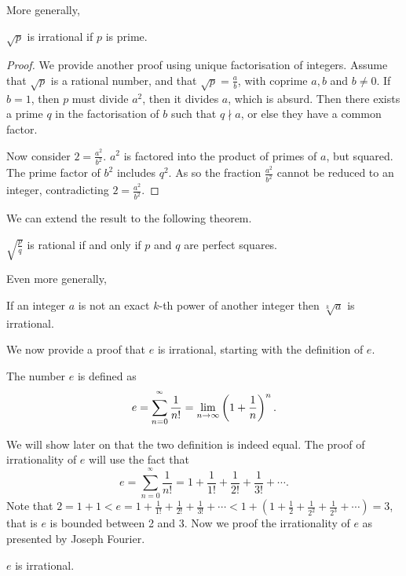 \documentclass[main.tex]{subfiles}
\begin{document}
		More generally,
		\begin{theorem}
			$\sqrt{p}$ is irrational if $p$ is prime.
		\end{theorem}
		\begin{proof}
			We provide another proof using unique factorisation of integers.
			Assume that $\sqrt{p}$ is a rational number, and that $\sqrt{p} = \frac{a}{b}$, with coprime $a, b$ and $b \neq 0$. If $b = 1$, then $p$ must divide $a^2$, then it divides $a$, which is absurd. Then there exists a prime $q$ in the factorisation of $b$ such that $q \nmid a$, or else they have a common factor.
			
			Now consider $2 = \frac{a^2}{b^2}$. $a^2$ is factored into the product of primes of $a$, but squared. The prime factor of $b^2$ includes $q^2$. As so the fraction $\frac{a^2}{b^2}$ cannot be reduced to an integer, contradicting $2 = \frac{a^2}{b^2}$.
		\end{proof}
		We can extend the result to the following theorem.
		\begin{theorem}
			$\sqrt{\frac{p}{q}}$ is rational if and only if $p$ and $q$ are perfect squares.
		\end{theorem}
		Even more generally,
		\begin{theorem}
			If an integer $a$ is not an exact $k$-th power of another integer then $\sqrt[k]{a}$ is irrational.
		\end{theorem}
		We now provide a proof that $e$ is irrational, starting with the definition of $e$.
		\begin{definition}
			The number $e$ is defined as
			\begin{equation*}
				 e = \sum_{n = 0}^{^\infty}\frac{1}{n!} = \lim_{n \rightarrow \infty}\left( 1 + \frac{1}{n}\right)^n.
			\end{equation*}
		\end{definition}
		We will show later on that the two definition is indeed equal. The proof of irrationality of $e$ will use the fact that 
		\begin{equation*}
			e = \sum_{n = 0}^{^\infty}\frac{1}{n!} = 1 + \frac{1}{1!} + \frac{1}{2!} + \frac{1}{3!} + \cdots.
		\end{equation*}
		Note that $2 = 1 + 1 < e = 1 + \frac{1}{1!} + \frac{1}{2!} + \frac{1}{3!} + \cdots < 1 + \left( 1 + \frac{1}{2} + \frac{1}{2^2} + \frac{1}{2^3} + \cdots\right) = 3$, that is $e$ is bounded between 2 and 3. Now we proof the irrationality of $e$ as presented by Joseph Fourier.
		\begin{theorem}
			$e$ is irrational.
		\end{theorem}
\end{document}
